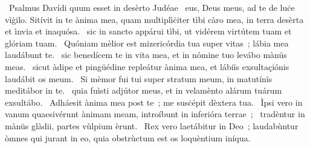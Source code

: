 {~Psalmus Davídi quum esset in desèrto Judéae}
{%
~eus, Deus meus, ad te de luċe vìġilo. Sitívit in te ànima mea, quam multiplìċiter tìbi càro mea, in terra desèrta et ìnvia et inaquósa.
~sic in sancto appárui tìbi, ut vidérem virtútem tuam et glóriam tuam.
~Quóniam mèlior est mizericórdia tua super vitas~; lábia mea laudábunt te.
~sic benedícem te in vita mea, et in nómine tuo levábo mànüs meas.
~sicut àdipe et pingüédine repleátur ànima mea, et lábiïs exsultaçiónis laudábit os meum.
~Si mèmor fui tui super stratum meum, in matutínïs meditábor in te.
~quia fuìsti adjútor meus, et in velamènto alárum tuárum exsultábo.
~Adháesit ànima mea post te~; me susċépit dèxtera tua.
~Ìpsi vero in vanum quaesivérunt ànimam meam, introíbunt in inferióra terrae~;
~tradèntur in mànüs glàdii, partes vùlpium èrunt.
~Rex vero laetábitur in Deo~; laudabùntur òmnes qui jurant in eo, quia obstrùctum est os loquèntium iníqua.}
